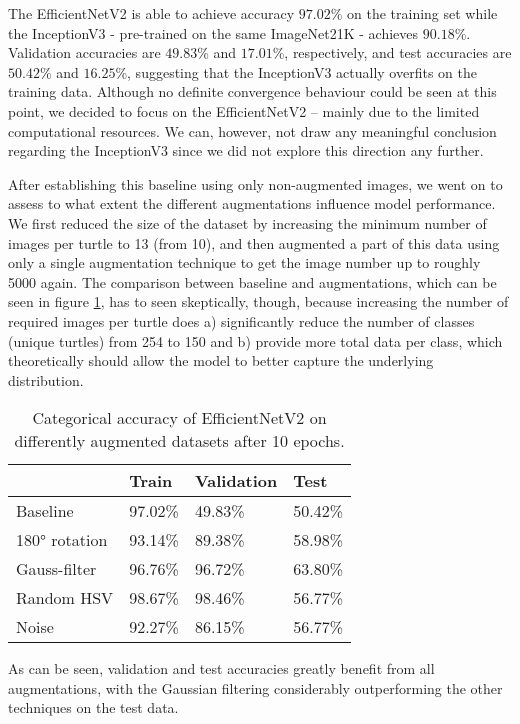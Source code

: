 The EfficientNetV2 is able to achieve accuracy $97.02\%$ on the training set while the InceptionV3 - pre-trained on the same ImageNet21K - achieves $90.18\%$. Validation accuracies are $49.83\%$ and $17.01\%$, respectively, and test accuracies are $50.42\%$ and $16.25\%$, suggesting that the InceptionV3 actually overfits on the training data. Although no definite convergence behaviour could be seen at this point, we decided to focus on the EfficientNetV2 -- mainly due to the limited computational resources. We can, however, not draw any meaningful conclusion regarding the InceptionV3 since we did not explore this direction any further.

After establishing this baseline using only non-augmented images, we went on to assess to what extent the different augmentations influence model performance. We first reduced the size of the dataset by increasing the minimum number of images per turtle to 13 (from 10), and then augmented a part of this data using only a single augmentation technique to get the image number up to roughly 5000 again. The comparison between baseline and augmentations, which can be seen in figure \ref{tab:augmentationComparison}, has to seen skeptically, though, because increasing the number of required images per turtle does a) significantly reduce the number of classes (unique turtles) from 254 to 150 and b) provide more total data per class, which theoretically should allow the model to better capture the underlying distribution.

\begin{table}[h]
    \centering
    \begin{tabular}{l|l|l|l|}
    \cline{2-4}
                                        & \textbf{Train} & \textbf{Validation} & \textbf{Test} \\ \hline
    \multicolumn{1}{|l|}{Baseline}      & 97.02\%        & 49.83\%             & 50.42\%       \\ \hline
    \multicolumn{1}{|l|}{180° rotation} & 93.14\%        & 89.38\%             & 58.98\%       \\ \hline
    \multicolumn{1}{|l|}{Gauss-filter}  & 96.76\%        & 96.72\%             & 63.80\%       \\ \hline
    \multicolumn{1}{|l|}{Random HSV}    & 98.67\%        & 98.46\%             & 56.77\%       \\ \hline
    \multicolumn{1}{|l|}{Noise}         & 92.27\%        & 86.15\%             & 56.77\%       \\ \hline
    \end{tabular}
    \caption[]{Categorical accuracy of EfficientNetV2 on differently augmented datasets after 10 epochs.}
    \label{tab:augmentationComparison}
\end{table}

As can be seen, validation and test accuracies greatly benefit from all augmentations, with the Gaussian filtering considerably outperforming the other techniques on the test data.
